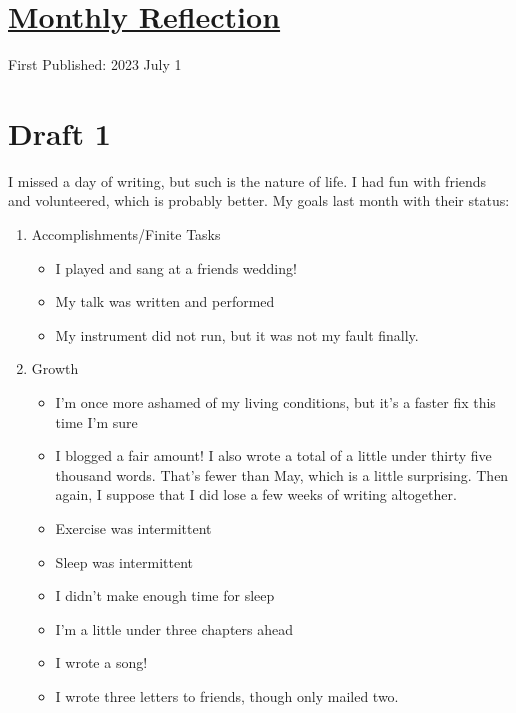 \documentclass[12pt]{article}[titlepage]
\renewcommand{\,}{\textsuperscript{,}}
\begin{document}
\doublespacing
\section{\href{reflection-june-23.html}{Monthly Reflection}}
First Published: 2023 July 1

\section{Draft 1}
I missed a day of writing, but such is the nature of life.
I had fun with friends and volunteered, which is probably better.
My goals last month with their status:

\begin{enumerate}
\item Accomplishments/Finite Tasks
\begin{itemize}
\item I played and sang at a friends wedding!
\item My talk was written and performed
\item My instrument did not run, but it was not my fault finally.
\end{itemize}
\item Growth
\begin{itemize}
\item I'm once more ashamed of my living conditions, but it's a faster fix this time I'm sure
\item I blogged a fair amount! I also wrote a total of a little under thirty five thousand words. That's fewer than May, which is a little surprising. Then again, I suppose that I did lose a few weeks of writing altogether.
\item Exercise was intermittent
\item Sleep was intermittent
\item I didn't make enough time for sleep
\item I'm a little under three chapters ahead
\item I wrote a song!
\item I wrote three letters to friends, though only mailed two.
\end{itemize}
\end{enumerate}
\end{document}
